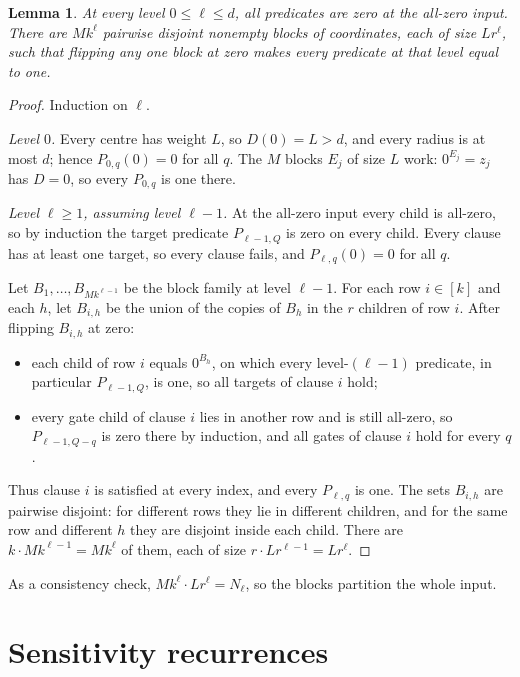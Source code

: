 \documentclass[11pt]{article}
\newtheorem{lemma}[theorem]{Lemma}
\theoremstyle{definition}
\theoremstyle{remark}
\begin{document}
\begin{lemma}\label{lem:blocks}
At every level \(0\le\ell\le d\), all predicates are zero at the
all-zero input. There are \(Mk^\ell\) pairwise disjoint nonempty blocks
of coordinates, each of size \(Lr^\ell\), such that flipping any one
block at zero makes every predicate at that level equal to one.
\end{lemma}
\begin{proof}
Induction on \(\ell\).

\emph{Level \(0\).} Every centre has weight \(L\), so \(D(0)=L>d\), and every
radius is at most \(d\); hence \(P_{0,q}(0)=0\) for all \(q\). The \(M\)
blocks \(E_j\) of size \(L\) work: \(0^{E_j}=z_j\) has \(D=0\), so every
\(P_{0,q}\) is one there.

\emph{Level \(\ell\ge1\), assuming level \(\ell-1\).}
At the all-zero input every child is all-zero, so by induction the target
predicate \(P_{\ell-1,Q}\) is zero on every child. Every clause has at least
one target, so every clause fails, and \(P_{\ell,q}(0)=0\) for all \(q\).

Let \(B_1,\ldots,B_{Mk^{\ell-1}}\) be the block family at level \(\ell-1\).
For each row \(i\in[k]\) and each \(h\), let \(B_{i,h}\) be the union of the
copies of \(B_h\) in the \(r\) children of row \(i\). After flipping
\(B_{i,h}\) at zero:
\begin{itemize}[leftmargin=2em]
\item each child of row \(i\) equals \(0^{B_h}\), on which every
level-\((\ell-1)\) predicate, in particular \(P_{\ell-1,Q}\), is one, so all
targets of clause \(i\) hold;
\item every gate child of clause \(i\) lies in another row and is still
all-zero, so \(P_{\ell-1,Q-q}\) is zero there by induction, and all gates
of clause \(i\) hold for every \(q\).
\end{itemize}
Thus clause \(i\) is satisfied at every index, and every \(P_{\ell,q}\) is one.
The sets \(B_{i,h}\) are pairwise disjoint: for different rows they lie in
different children, and for the same row and different \(h\) they are disjoint
inside each child. There are \(k\cdot Mk^{\ell-1}=Mk^\ell\) of them, each of
size \(r\cdot Lr^{\ell-1}=Lr^\ell\).
\end{proof}

As a consistency check, \(Mk^\ell\cdot Lr^\ell=N_\ell\), so the blocks
partition the whole input.

\section{Sensitivity recurrences}
\label{sec:recurrences}
\end{document}

